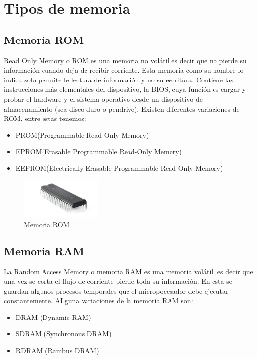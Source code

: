 \documentclass{article}
\begin{document}
\section{Tipos de memoria}

\subsection{Memoria ROM} 
Read Only Memory o ROM es una memoria no volátil es decir que no pierde su información cuando deja de recibir corriente. Esta memoria como su nombre lo indica solo permite le lectura de información y no su escritura. Contiene las instrucciones más elementales del dispositivo, la BIOS, cuya función es cargar y probar el hardware y el sistema operativo desde un dispositivo de almacenamiento (sea disco duro o pendrive). Existen diferentes variaciones de ROM, entre estas tenemos:

\begin{itemize}
    \item{PROM(Programmable Read-Only Memory)}
    \item{EPROM(Erasable Programmable Read-Only Memory)}
    \item{EEPROM(Electrically Erasable Programmable Read-Only Memory)}
\end{itemize}

\begin{figure}[h]
\includegraphics[width=4cm]{rom.jpg}
\centering
\caption{Memoria ROM}
\end{figure}

\subsection{Memoria RAM}
La Random Access Memory o memoria RAM es una memoria volátil, es decir que una vez se corta el flujo de corriente pierde toda su información. En esta se guardan algunos procesos temporales que el micropocesador debe ejecutar constantemente. ALguna variaciones de la memoria RAM son:
\begin{itemize}
    \item{DRAM (Dynamic RAM)}
    \item{SDRAM (Synchronous DRAM)}
    \item{RDRAM (Rambus DRAM)}
\end{itemize}
\end{document}
